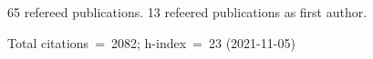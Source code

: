65 refereed publications. 13 refeered publications as first author.

Total citations~=~2082; h-index~=~23 (2021-11-05)